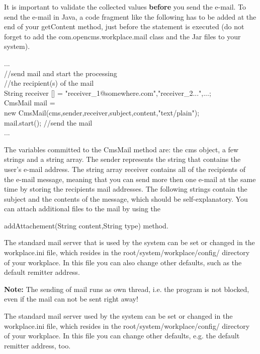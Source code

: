 It is important to validate the collected values {\bf before} you send the
e-mail. To send the e-mail in Java, a code fragment like the following
has to be added at the end of your {\meth getContent} method, just before the
statement is executed (do not forget to add the
{\class com.opencms.workplace.mail} class and the Jar files to your system).

\begin{java}
...\\
//send mail and start the processing\\
//the recipient(s) of the mail\\
String receiver [] = {"receiver\_1@somewhere.com","receiver\_2...",...};\\
CmsMail mail =\\
new CmsMail(cms,sender,receiver,subject,content,"text/plain");\\
mail.start(); //send the mail\\
...\\\end{java}


The variables committed to the {\meth CmsMail} method are: the {\name cms object}, a few
strings and a string array. The sender represents the string that
contains the user's e-mail address. The string {\code array} receiver contains
all of the recipients of the e-mail message, meaning that you can send
more then one e-mail at the same time by storing the recipients mail
addresses. The following strings contain the subject and the contents
of the message, which should be self-explanatory. You can attach
additional files to the mail by using the

{\meth  addAttachement(String content,String type)} method.

The standard mail server that is used by the system can be set or
changed in the {\name workplace.in}i file, which resides in the
{\dir root/system/workplace/config/} directory of your workplace. In this file
you can also change other defaults, such as the default remitter address.

{\bf Note:} The sending of mail runs as own thread, i.e. the program is not
blocked, even if the mail can not be sent right away!

The standard mail server used by the system can be set or changed in the
{\name workplace.ini} file, which resides in the {\dir root/system/workplace/config/}
directory of your workplace. In this file you can change other defaults,
e.g. the default remitter address, too.

